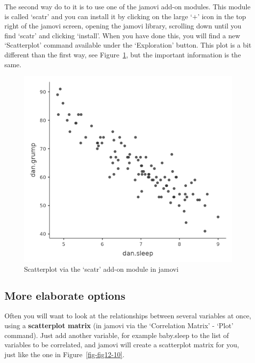 \documentclass[
  a4paper,
]{book}
\begin{document}
The second way do to it is to use one of the jamovi add-on modules. This
module is called `scatr' and you can install it by clicking on the large
`\(+\)' icon in the top right of the jamovi screen, opening the jamovi
library, scrolling down until you find `scatr' and clicking `install'.
When you have done this, you will find a new `Scatterplot' command
available under the `Exploration' button. This plot is a bit different
than the first way, see Figure~\ref{fig-fig12-9}, but the important
information is the same.

\begin{figure}

\includegraphics[width=1\textwidth,height=\textheight]{images/fig12-9.png} \hfill{}

\caption{\label{fig-fig12-9}Scatterplot via the `scatr' add-on module in
jamovi}

\end{figure}

\hypertarget{more-elaborate-options}{%
\subsection{More elaborate options}\label{more-elaborate-options}}

Often you will want to look at the relationships between several
variables at once, using a \textbf{scatterplot matrix} (in jamovi via
the `Correlation Matrix' - `Plot' command). Just add another variable,
for example baby.sleep to the list of variables to be correlated, and
jamovi will create a scatterplot matrix for you, just like the one in
Figure~\ref{fig-fig12-10}.
\end{document}
